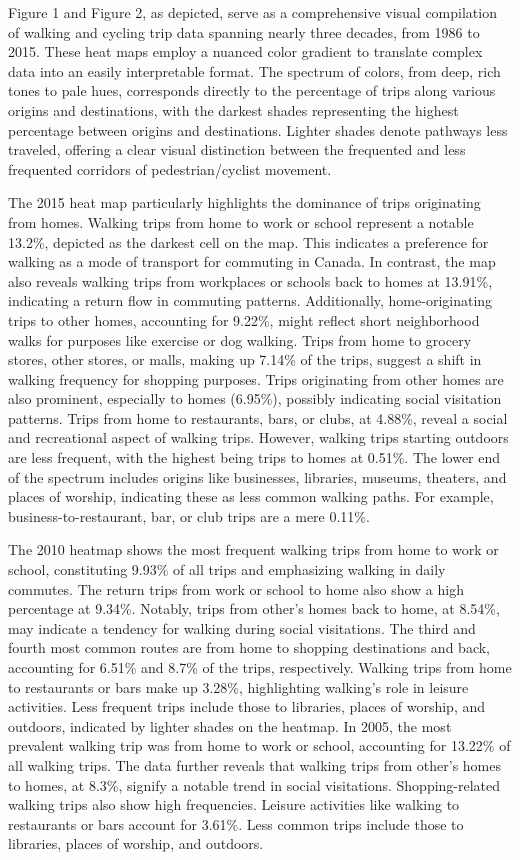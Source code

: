 \documentclass[12pt,twoside]{reedthesis}
\begin{document}
Figure 1 and Figure 2, as depicted, serve as a comprehensive visual compilation of walking and cycling trip data spanning nearly three decades, from 1986 to 2015. These heat maps employ a nuanced color gradient to translate complex data into an easily interpretable format. The spectrum of colors, from deep, rich tones to pale hues, corresponds directly to the percentage of trips along various origins and destinations, with the darkest shades representing the highest percentage between origins and destinations. Lighter shades denote pathways less traveled, offering a clear visual distinction between the frequented and less frequented corridors of pedestrian/cyclist movement.

The 2015 heat map particularly highlights the dominance of trips originating from homes. Walking trips from home to work or school represent a notable 13.2\%, depicted as the darkest cell on the map. This indicates a preference for walking as a mode of transport for commuting in Canada. In contrast, the map also reveals walking trips from workplaces or schools back to homes at 13.91\%, indicating a return flow in commuting patterns. Additionally, home-originating trips to other homes, accounting for 9.22\%, might reflect short neighborhood walks for purposes like exercise or dog walking. Trips from home to grocery stores, other stores, or malls, making up 7.14\% of the trips, suggest a shift in walking frequency for shopping purposes. Trips originating from other homes are also prominent, especially to homes (6.95\%), possibly indicating social visitation patterns. Trips from home to restaurants, bars, or clubs, at 4.88\%, reveal a social and recreational aspect of walking trips. However, walking trips starting outdoors are less frequent, with the highest being trips to homes at 0.51\%. The lower end of the spectrum includes origins like businesses, libraries, museums, theaters, and places of worship, indicating these as less common walking paths. For example, business-to-restaurant, bar, or club trips are a mere 0.11\%.

The 2010 heatmap shows the most frequent walking trips from home to work or school, constituting 9.93\% of all trips and emphasizing walking in daily commutes. The return trips from work or school to home also show a high percentage at 9.34\%. Notably, trips from other's homes back to home, at 8.54\%, may indicate a tendency for walking during social visitations. The third and fourth most common routes are from home to shopping destinations and back, accounting for 6.51\% and 8.7\% of the trips, respectively. Walking trips from home to restaurants or bars make up 3.28\%, highlighting walking's role in leisure activities. Less frequent trips include those to libraries, places of worship, and outdoors, indicated by lighter shades on the heatmap. In 2005, the most prevalent walking trip was from home to work or school, accounting for 13.22\% of all walking trips. The data further reveals that walking trips from other's homes to homes, at 8.3\%, signify a notable trend in social visitations. Shopping-related walking trips also show high frequencies. Leisure activities like walking to restaurants or bars account for 3.61\%. Less common trips include those to libraries, places of worship, and outdoors.
\end{document}
